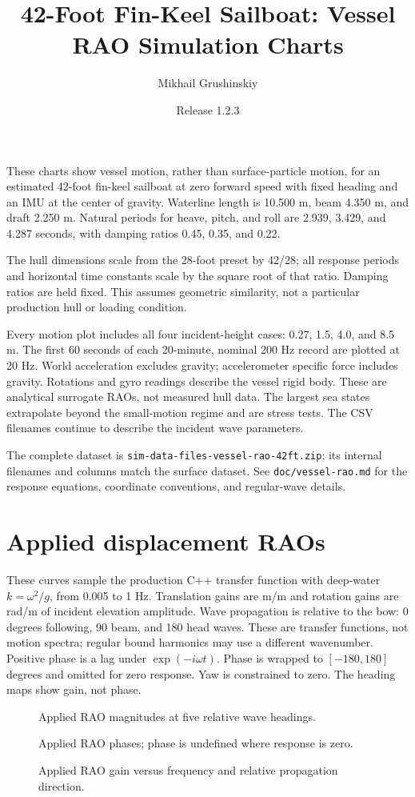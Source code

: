 \documentclass[11pt,letterpaper]{article}
\title{42-Foot Fin-Keel Sailboat: Vessel RAO Simulation Charts}
\author{Mikhail Grushinskiy}
\date{Release 1.2.3}
\newcommand{\VesselChart}[2]{
  \begin{figure}[H]\centering
  \resizebox{\textwidth}{!}{}
  \caption{#2}
  \end{figure}\clearpage
}
\begin{document}
\maketitle
These charts show vessel motion, rather than surface-particle motion, for an
estimated 42-foot fin-keel sailboat at zero forward speed with fixed heading
and an IMU at the center of gravity. Waterline length is 10.500 m, beam 4.350 m,
and draft 2.250 m. Natural periods for heave, pitch, and roll are 2.939, 3.429,
and 4.287 seconds, with damping ratios 0.45, 0.35, and 0.22.

The hull dimensions scale from the 28-foot preset by 42/28; all response
periods and horizontal time constants scale by the square root of that ratio.
Damping ratios are held fixed. This assumes geometric similarity, not a
particular production hull or loading condition.

Every motion plot includes all four incident-height cases: 0.27, 1.5, 4.0, and 8.5 m.
The first 60 seconds of each 20-minute, nominal 200 Hz record are plotted at
20 Hz. World acceleration excludes gravity; accelerometer specific force
includes gravity. Rotations and gyro readings describe the vessel rigid body.
These are analytical surrogate RAOs, not measured hull data. The largest sea
states extrapolate beyond the small-motion regime and are stress tests.
The CSV filenames continue to describe the incident wave parameters.

The complete dataset is \texttt{sim-data-files-vessel-rao-42ft.zip}; its internal
filenames and columns match the surface dataset. See \texttt{doc/vessel-rao.md}
for the response equations, coordinate conventions, and regular-wave details.
\clearpage
\section{Applied displacement RAOs}
These curves sample the production C++ transfer function with deep-water
$k=\omega^2/g$, from 0.005 to 1 Hz. Translation gains are m/m and rotation
gains are rad/m of incident elevation amplitude. Wave propagation is relative
to the bow: 0 degrees following, 90 beam, and 180 head waves. These are
transfer functions, not motion spectra; regular bound harmonics may use a
different wavenumber. Positive phase is a lag under $\exp(-i\omega t)$.
Phase is wrapped to $[-180,180]$ degrees and omitted for zero response.
Yaw is constrained to zero. The heading maps show gain, not phase.
\VesselChart{response_gain}{Applied RAO magnitudes at five relative wave headings.}
\VesselChart{response_phase}{Applied RAO phases; phase is undefined where response is zero.}
\VesselChart{response_heading}{Applied RAO gain versus frequency and relative propagation direction.}
\end{document}
